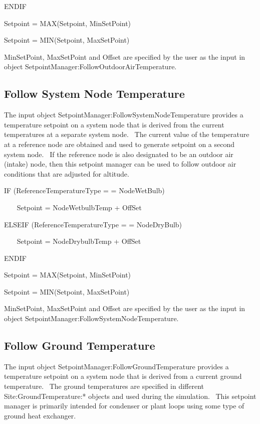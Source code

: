 ENDIF

Setpoint = MAX(Setpoint, MinSetPoint)

Setpoint = MIN(Setpoint, MaxSetPoint)

MinSetPoint, MaxSetPoint and Offset are specified by the user as the input in object SetpointManager:FollowOutdoorAirTemperature.

\subsection{Follow System Node Temperature}\label{follow-system-node-temperature}

The input object SetpointManager:FollowSystemNodeTemperature provides a temperature setpoint on a system node that is derived from the current temperatures at a separate system node.~ The current value of the temperature at a reference node are obtained and used to generate setpoint on a second system node.~ If the reference node is also designated to be an outdoor air (intake) node, then this setpoint manager can be used to follow outdoor air conditions that are adjusted for altitude.

IF (ReferenceTemperatureType = = NodeWetBulb)

~~~ Setpoint = NodeWetbulbTemp + OffSet

ELSEIF (ReferenceTemperatureType = = NodeDryBulb)

~~~ Setpoint = NodeDrybulbTemp + OffSet

ENDIF

Setpoint = MAX(Setpoint, MinSetPoint)

Setpoint = MIN(Setpoint, MaxSetPoint)

MinSetPoint, MaxSetPoint and Offset are specified by the user as the input in object SetpointManager:FollowSystemNodeTemperature.

\subsection{Follow Ground Temperature}\label{follow-ground-temperature}

The input object SetpointManager:FollowGroundTemperature provides a temperature setpoint on a system node that is derived from a current ground temperature.~ The ground temperatures are specified in different Site:GroundTemperature:* objects and used during the simulation.~ This setpoint manager is primarily intended for condenser or plant loops using some type of ground heat exchanger.

